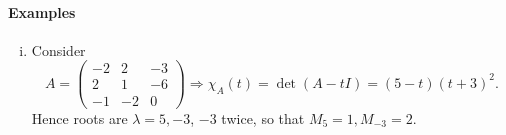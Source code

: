\documentclass[a4paper]{article}
\begin{document}
    \paragraph{Examples}
    \begin{example}
      \begin{enumerate}[(i)]
        \item Consider
          \[
            A=
            \begin{pmatrix}
              -2 & 2 & -3 \\
              2 & 1 & -6 \\
              -1 & -2 & 0
            \end{pmatrix}\Longrightarrow \chi_A(t)=\det (A-tI)=(5-t)(t+3)^2
          .\]
          Hence roots are $ \lambda=5,-3 $, $-3$ twice, so that $
          M_5=1, M_{-3}=2 $.


\end{enumerate}
\end{example}
\end{document}
